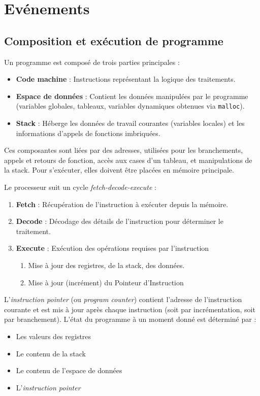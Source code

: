 \section{Evénements}\label{sec:evenements}
\subsection{Composition et exécution de programme}

Un programme est composé de trois parties principales :
\begin{itemize}
    \item \textbf{Code machine} : Instructions représentant la logique des traitements.
    \item \textbf{Espace de données} : Contient les données manipulées par le programme (variables globales, tableaux, variables dynamiques obtenues via \texttt{malloc}).
    \item \textbf{Stack} : Héberge les données de travail courantes (variables locales) et les informations d'appels de fonctions imbriquées.
\end{itemize}

Ces composantes sont liées par des adresses, utilisées pour les branchements, appels et retours de fonction, accès aux cases d'un tableau, et manipulations de la stack. 
Pour s'exécuter, elles doivent être placées en mémoire principale.

Le processeur suit un cycle \textit{fetch-decode-execute} :
\begin{enumerate}
    \item \textbf{Fetch} : Récupération de l'instruction à exécuter depuis la mémoire.
    \item \textbf{Decode} : Décodage des détails de l'instruction pour déterminer le traitement.
    \item \textbf{Execute} : Exécution des opérations requises par l'instruction
    \begin{enumerate}
        \item Mise à jour des registres, de la stack, des données.
        \item Mise à jour (incrément) du Pointeur d'Instruction
    \end{enumerate}
\end{enumerate}

L'\textit{instruction pointer} (ou \textit{program counter}) contient l'adresse de l'instruction courante et est mis à jour après chaque instruction (soit par incrémentation, soit par branchement). 
L'état du programme à un moment donné est déterminé par :
\begin{itemize}
    \item Les valeurs des registres
    \item Le contenu de la stack
    \item Le contenu de l'espace de données
    \item L'\textit{instruction pointer}
\end{itemize}

